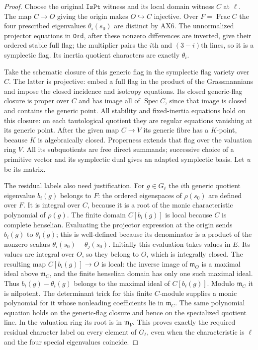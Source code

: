 \begin{proof}
Choose the original $\texttt{IsPt}$ witness and its local
domain witness $C$ at $\ell$.  The map $C\to O$ giving the
origin makes $O\hookrightarrow C$ injective.  Over
$F=\operatorname{Frac}C$ the four prescribed eigenvalues
$\theta_i(s_0)$ are distinct by AX6.  The unnormalized
projector equations in \texttt{Ord}, after these nonzero
differences are inverted, give their ordered stable full
flag; the multiplier pairs the $i$th and $(3-i)$th lines,
so it is a symplectic flag.  Its inertia quotient characters
are exactly $\theta_i$.

Take the schematic closure of this generic flag in the
symplectic flag variety over $C$.  The latter is projective:
embed a full flag in the product of the Grassmannians and
impose the closed incidence and isotropy equations.  Its
closed generic-flag closure is proper over $C$ and has image
all of $\operatorname{Spec}C$, since that image is closed and
contains the generic point.  All stability and fixed-inertia
equations hold on this closure: on each tautological
quotient they are regular equations vanishing at its generic
point.  After the given map $C\to V$ its generic fibre has a
$K$-point, because $K$ is algebraically closed.  Properness
extends that flag over the valuation ring $V$.
All its subquotients are free direct summands; successive
choice of a primitive vector and its symplectic dual gives
an adapted symplectic basis.  Let $u$ be its matrix.

The residual labels also need justification.  For $g\in G_\ell$
the $i$th generic quotient eigenvalue $b_i(g)$ belongs to
$F$: the ordered eigenspaces of $\rho(s_0)$ are defined over
$F$.  It is integral over $C$, because it is a root of the
monic characteristic polynomial of $\rho(g)$.
The finite domain $C[b_i(g)]$ is local because $C$ is
complete henselian.  Evaluating the projector expression
at the origin sends $b_i(g)$ to $\theta_i(g)$; this is
well-defined because its denominator is a product of the
nonzero scalars $\theta_i(s_0)-\theta_j(s_0)$.
Initially this evaluation takes values in $E$.  Its values
are integral over $O$, so they belong to $O$, which is
integrally closed.  The resulting map $C[b_i(g)]\to O$
is local: the inverse image of $\mathfrak m_O$ is a
maximal ideal above $\mathfrak m_C$, and the finite
henselian domain has only one such maximal ideal.
Thus $b_i(g)-\theta_i(g)$ belongs to the maximal ideal of
$C[b_i(g)]$.  Modulo $\mathfrak m_C$ it is nilpotent.
The determinant trick for this finite $C$-module supplies
a monic polynomial for it whose nonleading coefficients
lie in $\mathfrak m_C$.
The same polynomial equation holds on the generic-flag
closure and hence on the specialized quotient line.
In the valuation ring its root is in $\mathfrak m_V$.
This proves exactly the required residual character label
on every element of $G_\ell$, even when the characteristic
is $\ell$ and the four special eigenvalues coincide.


\end{proof}
